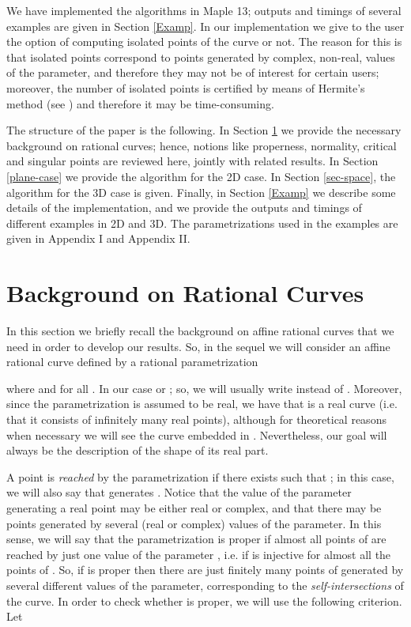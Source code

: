\documentclass{elsart}
\begin{document}
We have implemented the algorithms in Maple 13; outputs and
timings of several examples are given in Section \ref{Examp}. In
our implementation we give to the user the option of computing
isolated points of the curve or not. The reason for this is that
isolated points correspond to points generated by complex,
non-real, values of the parameter, and therefore they may not be
of interest for certain users; moreover, the number of isolated
points is certified by means of Hermite's method (see \cite{cox})
and therefore it may be time-consuming.

The structure of the paper is the following. In Section
\ref{sec-background} we provide the necessary background on
rational curves; hence, notions like properness, normality,
critical and singular points are reviewed here, jointly with
related results. In Section \ref{plane-case} we provide the
algorithm for the 2D case. In Section \ref{sec-space}, the
algorithm for the 3D case is given. Finally, in Section
\ref{Examp} we describe some details of the implementation, and we
provide the outputs and timings of different examples in 2D and
3D. The parametrizations used in the examples
are given in Appendix I and Appendix II.


\section{Background on Rational Curves}\label{sec-background}

In this section we briefly recall the background on affine rational curves
that we need in order to develop our results. So, in the sequel
we will consider an affine rational
curve  defined by a rational parametrization

where  and  for all . In our case  or ; so, we will usually write  instead of . Moreover, since the parametrization is assumed to be real, we have that  is a real curve (i.e. that it consists of infinitely many real points), although for theoretical reasons when necessary we will see the curve embedded in . Nevertheless, our goal will always be the description of the shape of its real part.





A point  is {\it reached} by the
parametrization  if there exists 
such that ; in this case, we will also say that
 generates . Notice that the value of the parameter
generating a real point may be either real or complex, and that
there may be points generated by several (real or complex) values
of the parameter. In this sense, we will say that the
parametrization  is {\sf proper} if almost all points
of  are reached by just one value of the parameter
, i.e. if  is injective for almost all the points
of . So, if  is proper then there are
just finitely many points of  generated by several
different values of the parameter, corresponding to the {\it
self-intersections} of the curve. In order to check whether
 is proper, we will use the following criterion. Let
\end{document}
